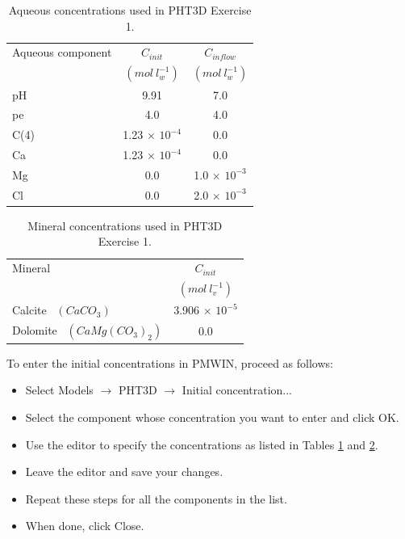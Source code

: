 \begin{table}[hb]
\caption{Aqueous concentrations used in PHT3D Exercise 1.}
\begin{center}
\begin{tabular}{l c c}
\hline
 Aqueous component       & $C_{init}$ & $C_{inflow}$      \\
                & $(mol\ l^{-1}_w)$   & $(mol\ l^{-1}_w)$      \\ \hline
 pH             &   9.91    &  7.0            \\
 pe             &   4.0     &  4.0            \\
 C(4)           &  1.23 $\times$ $10^{-4}$ &   $  0.0  $              \\
 Ca             &  1.23 $\times$ $10^{-4}$ &   $  0.0  $               \\
 Mg             &     0.0                  & 1.0 $\times$ $10^{-3}$   \\
 Cl             &     0.0                  & 2.0 $\times$ $10^{-3}$   \\ \hline
\end{tabular}
\label{ex2_caqu}
\end{center}
\end{table}

\begin{table}[hb]
\caption{Mineral concentrations used in PHT3D Exercise 1.}
\begin{center}
\begin{tabular}{ l c }
\hline
 Mineral        & $C_{init}$  \\
                  & $(mol\ l^{-1}_{v})$  \\ \hline
 Calcite \   $(CaCO_3)  $  & 3.906 $\times$ $10^{-5}$  \\
 Dolomite  \ $(CaMg(CO_3)_2) $  &   0.0             \\ \hline
\end{tabular}
\label{ex2_cmin}
\end{center}
\end{table}

To enter the initial concentrations in PMWIN, proceed as follows:

\begin{itemize}

\item Select Models $\rightarrow$ PHT3D $\rightarrow$ Initial concentration...

\item Select the component whose concentration you want to enter and click OK.

\item Use the editor to specify the concentrations as listed in Tables \ref{ex2_caqu} and \ref{ex2_cmin}. 

\item Leave the editor and save your changes.

\item Repeat these steps for all the components in the list.

\item When done, click Close.

\end{itemize}

